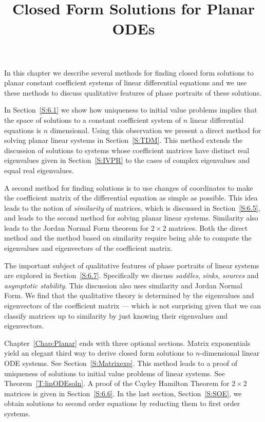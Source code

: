 \documentclass{ximera}
\title{Closed Form Solutions for Planar ODEs}
\begin{document}
\begin{abstract}
\end{abstract}
\maketitle


\label{Chap:Planar}

\normalsize

In this chapter we describe several methods for finding closed form
solutions to planar constant coefficient systems of linear differential
equations and we use these methods to discuss qualitative features 
of phase portraits of these solutions.

In Section~\ref{S:6.1} we show how uniqueness to
initial value problems implies that the space of solutions to a constant
coefficient system of $n$ linear differential equations is $n$ dimensional.
Using this observation we present a direct method for solving planar linear
systems in Section~\ref{S:TDM}.  This method extends the discussion of
solutions to systems whose coefficient matrices have distinct real
eigenvalues given in Section~\ref{S:IVPR} to the cases of complex
eigenvalues and equal real eigenvalues.

A second method for finding solutions is to use changes of coordinates to 
make the coefficient matrix of the differential equation as simple as possible.  
This idea leads to the notion of {\em similarity\/} of matrices, which is discussed 
in Section~\ref{S:6.5}, and leads to the second method for solving planar linear 
systems. Similarity also leads to the Jordan Normal Form theorem for 
$2\times 2$ matrices.
Both the direct method and the method based on similarity require 
being able to compute the eigenvalues and eigenvectors of the coefficient matrix.

The important subject of qualitative features of phase portraits of linear systems are explored in
Section~\ref{S:6.7}.  Specifically we discuss {\em saddles\/}, {\em sinks\/}, 
{\em sources\/} and {\em asymptotic stability}.  This discussion also uses similarity 
and Jordan Normal Form.  We find that the qualitative theory is determined 
by the eigenvalues and eigenvectors of the coefficient matrix --- which is not 
surprising given that we can classify matrices up to similarity by just knowing 
their eigenvalues and eigenvectors.  

Chapter~\ref{Chap:Planar} ends with three optional sections.  Matrix exponentials 
yield an elegant third way to derive closed form solutions to $n$-dimensional linear 
ODE systems.  See  Section~\ref{S:Matrixexp}.  This method 
leads to a proof of uniqueness of solutions to initial value problems of linear systems.  
See Theorem~\ref{T:linODEsoln}.  A proof of the Cayley Hamilton Theorem 
for $2\times 2$ matrices is given in Section~\ref{S:6.6}.
In the last section, Section~\ref{S:SOE}, we obtain solutions to second order 
equations by reducting them to first order systems.
\end{document}
